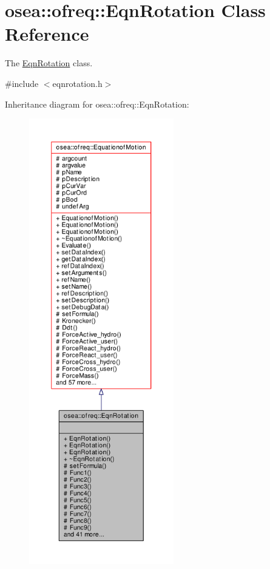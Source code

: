 \hypertarget{classosea_1_1ofreq_1_1_eqn_rotation}{\section{osea\-:\-:ofreq\-:\-:Eqn\-Rotation Class Reference}
\label{classosea_1_1ofreq_1_1_eqn_rotation}
}


The \hyperlink{classosea_1_1ofreq_1_1_eqn_rotation}{Eqn\-Rotation} class.  




{\ttfamily \#include $<$eqnrotation.\-h$>$}



Inheritance diagram for osea\-:\-:ofreq\-:\-:Eqn\-Rotation\-:\nopagebreak
\begin{figure}[H]
\begin{center}
\leavevmode
\includegraphics[height=550pt]{classosea_1_1ofreq_1_1_eqn_rotation__inherit__graph}
\end{center}
\end{figure}
